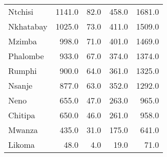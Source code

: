 \begin{tabular}{lrrrr}
Ntchisi        &   1141.0 &    82.0 &    458.0 &    1681.0 \\
Nkhatabay      &   1025.0 &    73.0 &    411.0 &    1509.0 \\
Mzimba         &    998.0 &    71.0 &    401.0 &    1469.0 \\
Phalombe       &    933.0 &    67.0 &    374.0 &    1374.0 \\
Rumphi         &    900.0 &    64.0 &    361.0 &    1325.0 \\
Nsanje         &    877.0 &    63.0 &    352.0 &    1292.0 \\
Neno           &    655.0 &    47.0 &    263.0 &     965.0 \\
Chitipa        &    650.0 &    46.0 &    261.0 &     958.0 \\
Mwanza         &    435.0 &    31.0 &    175.0 &     641.0 \\
Likoma         &     48.0 &     4.0 &     19.0 &      71.0 \\
\bottomrule
\end{tabular}
